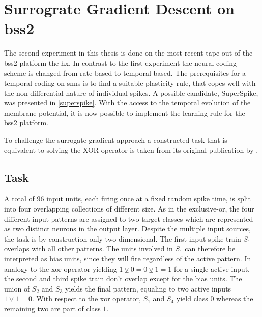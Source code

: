 \chapter{Surrograte Gradient Descent on \acrshort{bss2}}

The second experiment in this thesis is done on the most recent tape-out of the \gls{bss2} platform the \gls{hx}. In contrast to the first experiment the neural coding scheme is changed from rate based to temporal based. The prerequisites for a temporal coding on \glspl{snn} is to find a suitable plasticity rule, that copes well with the non-differential nature of individual spikes. A possible candidate, SuperSpike, was presented in \cref{superspike}. With the access to the temporal evolution of the membrane potential, it is now possible to implement the learning rule for the \gls{bss2} platform.

To challenge the surrogate gradient approach a constructed task that is equivalent to solving the XOR operator is taken from its original publication by \cite{zenke2018superspike}.

\section{Task}
A total of 96 input units, each firing once at a fixed random spike time, is split into four overlapping collections of different size. As in the exclusive-or, the four different input patterns are assigned to two target classes which are represented as two distinct neurons in the output layer. Despite the multiple input sources, the task is by construction only two-dimensional. The first input spike train $S_1$ overlaps with all other patterns. The units involved in $S_1$ can therefore be interpreted as bias units, since they will fire regardless of the active pattern. In analogy to the xor operator yielding $1 \veebar 0 = 0 \veebar 1 = 1$ for a single active input, the second and third spike train don't overlap except for the bias units. The union of $S_2$ and $S_3$ yields the final pattern, equaling to two active inputs $1 \veebar 1 = 0$. With respect to the xor operator, $S_1$ and $S_4$ yield class $0$ whereas the remaining two are part of class $1$. 

